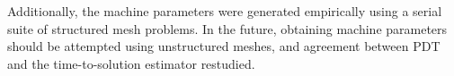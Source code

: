 Additionally, the machine parameters were generated empirically using a serial suite of structured mesh problems.
In the future, obtaining machine parameters should be attempted using unstructured meshes, and agreement between PDT and the time-to-solution estimator restudied.


%
%
